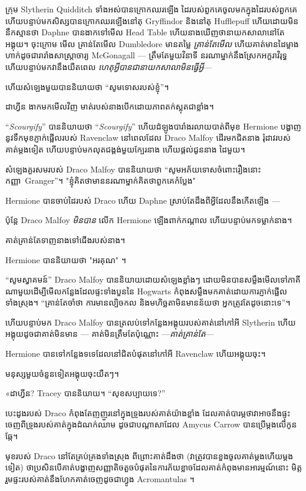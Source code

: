 {{{ក្រុម Slytherin Quidditch ទាំងអស់បានក្រោកឈរឡើង ដៃរបស់ពួកគេចូលមកក្នុងដៃរបស់ពួកគេ ហើយបន្ទាប់មកសិស្សបានក្រោកឈរឡើងនៅតុ Gryffindor និងនៅតុ Hufflepuff ហើយដោយមិននឹកស្មានថា Daphne បានងាកទៅមើល Head Table ហើយនាងឃើញថានាយកសាលានៅតែអង្គុយ។ ចុះក្រោម មើល គ្រាន់តែមើល Dumbledore មានតម្លៃ \emph{គ្រាន់តែមើល} ហើយគាត់មានដៃម្ខាង ហាក់ដូចជារារាំងសាស្រ្តាចារ្យ McGonagall — ត្រឹមតែមួយវិនាទី នរណាម្នាក់នឹងស្រែកអក្ខរាវិរុទ្ធ ហើយបន្ទាប់មកវានឹងយឺតពេល \emph{ ហេតុអ្វីបានជានាយកសាលាមិនធ្វើអ្វី}—

ហើយ​សំឡេង​មួយ​បាន​និយាយ​ថា “សូម​ទោស​របស់​ខ្ញុំ”។

ដាហ្វីន ងាកមកមើលវិញ មាត់របស់នាងបើកដោយភាពតក់ស្លុតជាខ្លាំង។

“\emph{Scourgify}” បាននិយាយថា “\emph{Scourgify}” ហើយដំឡូងបារាំងរលាយបាត់ពីមុខ Hermione បង្ហាញនូវទឹកមុខភ្ញាក់ផ្អើលរបស់ Ravenclaw នៅពេលដែល Draco Malfoy ដើរមកជិតនាង រុំដាវរបស់គាត់ម្តងទៀត ហើយបន្ទាប់មកលុតជង្គង់មួយក្បែរនាង ហើយផ្តល់ជូននាង ដៃមួយ។

សំឡេងគួរសមរបស់ Draco Malfoy បាននិយាយថា “សូមអភ័យទោសចំពោះរឿងនោះ កញ្ញា~Granger”។ "ខ្ញុំគិតថាមាននរណាម្នាក់គិតថាពួកគេកំប្លែង"

Hermione បានចាប់ដៃរបស់ Draco ហើយ Daphne ស្រាប់តែដឹងពីអ្វីដែលនឹងកើតឡើង —

ប៉ុន្តែ Draco Malfoy \emph{មិនបាន} លើក Hermione ឡើងពាក់កណ្តាល ហើយបន្ទាប់មកទម្លាក់នាង។

គាត់គ្រាន់តែទាញនាងទៅជើងរបស់នាង។

Hermione បាននិយាយថា "អរគុណ" ។

“សូមស្វាគមន៍” Draco Malfoy បាននិយាយដោយសំឡេងខ្លាំងៗ ដោយមិនបានសម្លឹងមើលទៅភាគីណាមួយដើម្បីមើលកន្លែងដែលផ្ទះទាំងបួននៃ Hogwarts កំពុងសម្លឹងមកគាត់ដោយការភ្ញាក់ផ្អើលទាំងស្រុង។ “គ្រាន់តែចាំថា ការមានល្បិចកល និងមហិច្ឆតាមិនមានន័យថា អ្នកត្រូវតែដូចនោះទេ”។

ហើយបន្ទាប់មក Draco Malfoy បានត្រលប់ទៅកន្លែងអង្គុយរបស់គាត់នៅកៅអី Slytherin ហើយអង្គុយដូចជាគាត់មិនមាន — គាត់មិនត្រឹមតែប៉ុណ្ណោះ —\emph{គាត់គ្រាន់តែ}—

Hermione បានទៅកន្លែងទទេដែលនៅជិតបំផុតនៅកៅអី Ravenclaw ហើយអង្គុយចុះ។

មនុស្សមួយចំនួនទៀតអង្គុយចុះយឺតៗ។

«ដាហ្វីន? Tracey បាននិយាយ។ “សុខសប្បាយទេ?”

\later

បេះដូងរបស់ Draco កំពុងតែញញួរនៅក្នុងទ្រូងរបស់គាត់យ៉ាងខ្លាំង ដែលគាត់បារម្ភថាវាអាចនឹងផ្ទុះចេញពីទ្រូងរបស់គាត់ក្នុងដំណក់ឈាម ដូចជាបណ្តាសាដែល Amycus Carrow បានប្រើម្តងលើកូនឆ្កែ។

មុខរបស់ Draco នៅតែគ្រប់គ្រងទាំងស្រុង ពីព្រោះគាត់ដឹងថា (វាត្រូវបានខួងចូលគាត់ម្តងហើយម្តងទៀត) ថាប្រសិនបើគាត់បង្ហាញសញ្ញាតិចតួចបំផុតនៃការភ័យខ្លាចដែលគាត់កំពុងមានអារម្មណ៍នោះ មិត្តរួមផ្ទះរបស់គាត់នឹងហែកគាត់ចេញដូចជាហ្វូង Acromantulas ។

}}}
